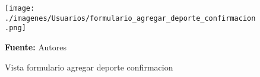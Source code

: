 \begin{figure}[!htb]
  \begin{center}
\texttt{[image: ./imagenes/Usuarios/formulario\_agregar\_deporte\_confirmacion.png]}
    \caption{Vista formulario agregar deporte confirmacion}
    \label{fig:Vista_formulario_agregar_deporte_confirmacion}
    \textbf{Fuente:}  Autores
  \end{center}
\end{figure}
